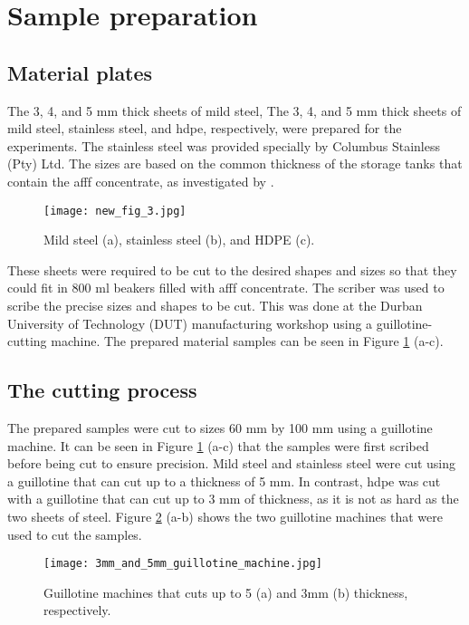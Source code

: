 \section{Sample preparation}
\subsection{Material plates}
The 3, 4, and 5 mm thick sheets of mild steel, The 3, 4, and 5 mm thick sheets of mild steel, stainless steel, and \acrshort{hdpe}, respectively, were prepared for the experiments. The stainless steel was provided specially by Columbus Stainless (Pty) Ltd. The sizes are based on the common thickness of the storage tanks that contain the \acrshort{afff} concentrate, as investigated by \cite{protopopoff2011surface}.

\begin{figure}[H]
    \centering
    \texttt{[image: new\_fig\_3.jpg]}
    \caption{Mild steel (a), stainless steel (b), and HDPE (c).}
    \label{ch4:figure:samples}
\end{figure}

These sheets were required to be cut to the desired shapes and sizes so that they could fit in 800 ml beakers filled with \acrshort{afff} concentrate. The scriber was used to scribe the precise sizes and shapes to be cut. This was done at the Durban University of Technology (DUT) manufacturing workshop using a guillotine-cutting machine. The prepared material samples can be seen in Figure \ref{ch4:figure:samples} (a-c).


\subsection{The cutting process}
The prepared samples were cut to sizes 60 mm by 100 mm using a guillotine machine. It can be seen in Figure \ref{ch4:figure:samples} (a-c) that the samples were first scribed before being cut to ensure precision. Mild steel and stainless steel were cut using a guillotine that can cut up to a thickness of 5 mm. In contrast, \acrshort{hdpe} was cut with a guillotine that can cut up to 3 mm of thickness, as it is not as hard as the two sheets of steel. Figure \ref{ch4:figure:guillotines} (a-b) shows the two guillotine machines that were used to cut the samples.

\begin{figure}[H]
    \centering
    \texttt{[image: 3mm\_and\_5mm\_guillotine\_machine.jpg]}
    \caption{Guillotine machines that cuts up to 5 (a) and 3mm (b) thickness, respectively.}
    \label{ch4:figure:guillotines}
\end{figure}

